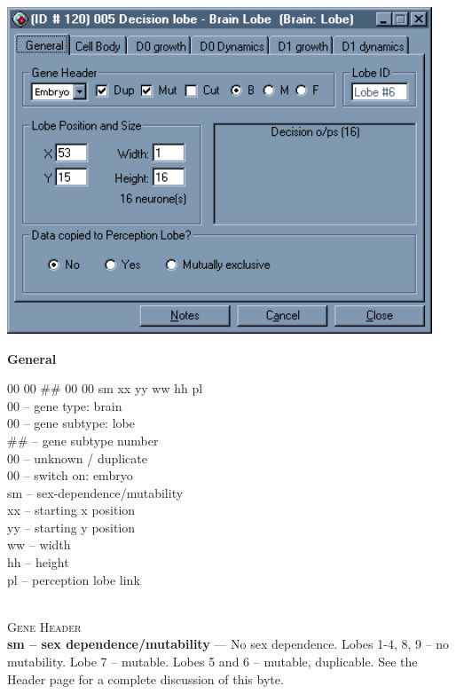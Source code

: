 \documentclass[11pt,twoside,a4paper]{article}
\begin{document}
\begin{minipage}[ht]{0.40\textwidth}
	\includegraphics[width=0.95\textwidth]{img/gen00k1.png}
\end{minipage} \hfill \begin{minipage}[ht]{0.575\textwidth}
	\textbf{\large General} %

	00 00 \#\# 00 00 sm xx yy ww hh pl ~\\

	00 -- gene type: brain ~\\
	00 -- gene subtype: lobe ~\\
	\#\# -- gene subtype number ~\\
	00 -- unknown / duplicate~\\
	00 -- switch on: embryo ~\\
	sm -- sex-dependence/mutability ~\\
	xx -- starting x position ~\\
	yy -- starting y position ~\\
	ww -- width ~\\
	hh -- height ~\\
	pl -- perception lobe link ~\\
\end{minipage} ~\\

\textsc{Gene Header}~\\

\textbf{sm -- sex dependence/mutability} --- No sex dependence. Lobes 1-4, 8, 9 -- no mutability. Lobe 7 -- mutable. Lobes 5 and 6 -- mutable, duplicable. See the Header page for a complete discussion of this byte. ~\\
\end{document}
